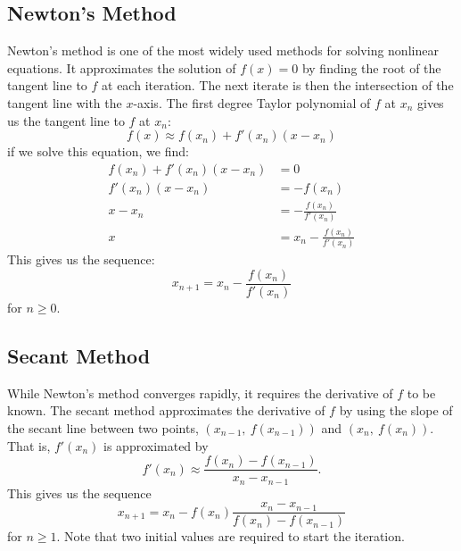 \documentclass{article}
\begin{document}
\subsection{Newton's Method}
Newton's method is one of the most widely used methods for solving
nonlinear equations. It approximates the solution of \(f\left( x
\right) = 0\) by finding the root of the tangent line to \(f\) at each
iteration. The next iterate is then the intersection of the tangent
line with the \(x\)-axis. The first degree Taylor polynomial of \(f\)
at \(x_n\) gives us the tangent line to \(f\) at \(x_n\):
\begin{equation*}
    f\left( x \right) \approx f\left( x_n \right) + f'\left( x_n \right) \left( x - x_n \right)
\end{equation*}
if we solve this equation, we find:
\begin{align*}
    f\left( x_n \right) + f'\left( x_n \right) \left( x - x_n \right) & = 0                                                      \\
    f'\left( x_n \right) \left( x - x_n \right)                       & = -f\left( x_n \right)                                   \\
    x - x_n                                                           & = -\frac{f\left( x_n \right)}{f'\left( x_n \right)}      \\
    x                                                                 & = x_n - \frac{f\left( x_n \right)}{f'\left( x_n \right)}
\end{align*}
This gives us the sequence:
\begin{equation*}
    x_{n + 1} = x_n - \frac{f\left( x_n \right)}{f'\left( x_n \right)}
\end{equation*}
for \(n \geq 0\).
\subsection{Secant Method}
While Newton's method converges rapidly, it requires the derivative of
\(f\) to be known. The secant method approximates the derivative of
\(f\) by using the slope of the secant line between two points,
\(\left( x_{n - 1},\: f\left( x_{n - 1} \right)\right)\) and \(\left(
x_n,\: f\left( x_n \right) \right)\). That is, \(f'\left( x_n \right)\)
is approximated by
\begin{equation*}
    f'\left( x_n \right) \approx \frac{f\left( x_n \right) - f\left( x_{n - 1} \right)}{x_n - x_{n - 1}}.
\end{equation*}
This gives us the sequence
\begin{equation*}
    x_{n + 1} = x_n - f\left( x_n \right) \frac{x_n - x_{n - 1}}{f\left( x_n \right) - f\left( x_{n - 1} \right)}
\end{equation*}
for \(n \geq 1\). Note that two initial values are required to start the
iteration.
\end{document}

